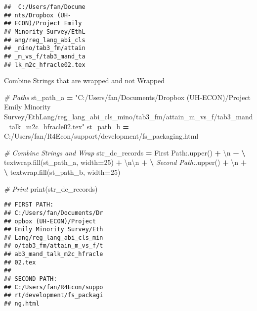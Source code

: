 \documentclass[
]{book}
\newenvironment{Shaded}{\begin{snugshade}}{\end{snugshade}}
\newcommand{\BuiltInTok}[1]{#1}
\newcommand{\CharTok}[1]{\textcolor[rgb]{0.31,0.60,0.02}{#1}}
\newcommand{\CommentTok}[1]{\textcolor[rgb]{0.56,0.35,0.01}{\textit{#1}}}
\newcommand{\DecValTok}[1]{\textcolor[rgb]{0.00,0.00,0.81}{#1}}
\newcommand{\NormalTok}[1]{#1}
\newcommand{\OperatorTok}[1]{\textcolor[rgb]{0.81,0.36,0.00}{\textbf{#1}}}
\newcommand{\StringTok}[1]{\textcolor[rgb]{0.31,0.60,0.02}{#1}}
\begin{document}
\begin{verbatim}
##  C:/Users/fan/Docume
## nts/Dropbox (UH-
## ECON)/Project Emily
## Minority Survey/EthL
## ang/reg_lang_abi_cls
## _mino/tab3_fm/attain
## _m_vs_f/tab3_mand_ta
## lk_m2c_hfracle02.tex
\end{verbatim}

Combine Strings that are wrapped and not Wrapped

\begin{Shaded}
\begin{Highlighting}[]

\CommentTok{\# Paths}
\NormalTok{st\_path\_a }\OperatorTok{=} \StringTok{"C:/Users/fan/Documents/Dropbox (UH{-}ECON)/Project Emily Minority Survey/EthLang/reg\_lang\_abi\_cls\_mino/tab3\_fm/attain\_m\_vs\_f/tab3\_mand\_talk\_m2c\_hfracle02.tex"}
\NormalTok{st\_path\_b }\OperatorTok{=} \StringTok{\textquotesingle{}C:/Users/fan/R4Econ/support/development/fs\_packaging.html\textquotesingle{}}

\CommentTok{\# Combine Strings and Wrap}
\NormalTok{str\_dc\_records }\OperatorTok{=} \StringTok{\textquotesingle{}First Path:\textquotesingle{}}\NormalTok{.upper() }\OperatorTok{+} \StringTok{\textquotesingle{}}\CharTok{\textbackslash{}n}\StringTok{\textquotesingle{}} \OperatorTok{+} \OperatorTok{\textbackslash{}}
\NormalTok{                 textwrap.fill(st\_path\_a, width}\OperatorTok{=}\DecValTok{25}\NormalTok{) }\OperatorTok{+} \StringTok{\textquotesingle{}}\CharTok{\textbackslash{}n\textbackslash{}n}\StringTok{\textquotesingle{}} \OperatorTok{+} \OperatorTok{\textbackslash{}}
                 \CommentTok{\textquotesingle{}Second Path:\textquotesingle{}}\NormalTok{.upper() }\OperatorTok{+} \StringTok{\textquotesingle{}}\CharTok{\textbackslash{}n}\StringTok{\textquotesingle{}} \OperatorTok{+} \OperatorTok{\textbackslash{}}
\NormalTok{                 textwrap.fill(st\_path\_b, width}\OperatorTok{=}\DecValTok{25}\NormalTok{)}
              
\CommentTok{\# Print}
\BuiltInTok{print}\NormalTok{(str\_dc\_records)                 }
\end{Highlighting}
\end{Shaded}

\begin{verbatim}
## FIRST PATH:
## C:/Users/fan/Documents/Dr
## opbox (UH-ECON)/Project
## Emily Minority Survey/Eth
## Lang/reg_lang_abi_cls_min
## o/tab3_fm/attain_m_vs_f/t
## ab3_mand_talk_m2c_hfracle
## 02.tex
## 
## SECOND PATH:
## C:/Users/fan/R4Econ/suppo
## rt/development/fs_packagi
## ng.html
\end{verbatim}
\end{document}

